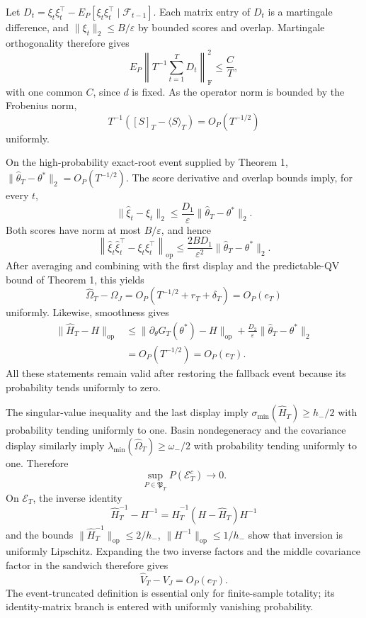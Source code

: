 Let \(D_t=\xi_t\xi_t^\top-E_P[\xi_t\xi_t^\top\mid\mathcal F_{t-1}]\). Each matrix entry of \(D_t\) is a martingale difference, and \(\|\xi_t\|_2\le B/\varepsilon\) by bounded scores and overlap. Martingale orthogonality therefore gives
\[
 E_P\left\|T^{-1}\sum_{t=1}^TD_t\right\|_{\mathrm F}^2
 \le \frac{C}{T},
\]
with one common \(C\), since \(d\) is fixed. As the operator norm is bounded by the Frobenius norm,
\[
 T^{-1}([S]_T-\langle S\rangle_T)=O_P(T^{-1/2})
\]
uniformly.

On the high-probability exact-root event supplied by Theorem 1, \(\|\widehat\theta_T-\theta^*\|_2=O_P(T^{-1/2})\). The score derivative and overlap bounds imply, for every \(t\),
\[
 \|\widehat\xi_t-\xi_t\|_2
 \le \frac{D_1}{\varepsilon}\|\widehat\theta_T-\theta^*\|_2.
\]
Both scores have norm at most \(B/\varepsilon\), and hence
\[
 \left\|\widehat\xi_t\widehat\xi_t^\top-\xi_t\xi_t^\top\right\|_{\mathrm{op}}
 \le \frac{2BD_1}{\varepsilon^2}\|\widehat\theta_T-\theta^*\|_2.
\]
After averaging and combining with the first display and the predictable-QV bound of Theorem 1, this yields
\[
 \widehat\Omega_T-\Omega_J=O_P(T^{-1/2}+r_T+\delta_T)=O_P(e_T)
\]
uniformly. Likewise, smoothness gives
\[
\begin{aligned}
 \|\widehat H_T-H\|_{\mathrm{op}}
 &\le \|\partial_\theta G_T(\theta^*)-H\|_{\mathrm{op}}
 +\frac{D_2}{\varepsilon}\|\widehat\theta_T-\theta^*\|_2\\
 &=O_P(T^{-1/2})=O_P(e_T).
\end{aligned}
\]
All these statements remain valid after restoring the fallback event because its probability tends uniformly to zero.

The singular-value inequality and the last display imply \(\sigma_{\min}(\widehat H_T)\ge h_-/2\) with probability tending uniformly to one. Basin nondegeneracy and the covariance display similarly imply \(\lambda_{\min}(\widehat\Omega_T)\ge\omega_-/2\) with probability tending uniformly to one. Therefore
\[
 \sup_{P\in\mathfrak P_T}P(\mathcal E_T^c)\to0.
\]
On \(\mathcal E_T\), the inverse identity
\[
 \widehat H_T^{-1}-H^{-1}
 =\widehat H_T^{-1}(H-\widehat H_T)H^{-1}
\]
and the bounds \(\|\widehat H_T^{-1}\|_{\mathrm{op}}\le2/h_-\), \(\|H^{-1}\|_{\mathrm{op}}\le1/h_-\) show that inversion is uniformly Lipschitz. Expanding the two inverse factors and the middle covariance factor in the sandwich therefore gives
\[
 \widehat V_T-V_J=O_P(e_T).
\]
The event-truncated definition is essential only for finite-sample totality; its identity-matrix branch is entered with uniformly vanishing probability.

